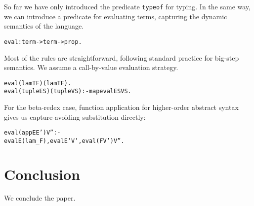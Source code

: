 \documentclass[format=acmlarge,review,anonymous]{acmart}\settopmatter{printfolios=true}
\begin{document}
So far we have only introduced the predicate \texttt{typeof} for typing. In the same way, we can introduce
a predicate for evaluating terms, capturing the dynamic semantics of the language.

\begin{alltt}
eval : term -> term -> prop.
\end{alltt}

Most of the rules are straightforward, following standard practice for big-step semantics.  We
assume a call-by-value evaluation strategy.

\begin{alltt}
eval (lam T F) (lam T F).
eval (tuple ES) (tuple VS) :- map eval ES VS.
\end{alltt}

For the beta-redex case, function application for higher-order abstract syntax gives us
capture-avoiding substitution directly:

\begin{alltt}
eval (app E E') V'' :-
  eval E (lam _ F), eval E' V', eval (F V') V''.
\end{alltt}


\section{Conclusion}

\TODO{} We conclude the paper.


\end{document}
